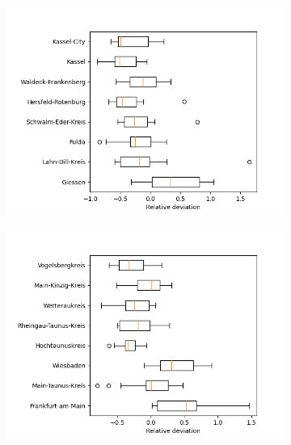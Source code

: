 \begin{figure}[h]
	\centering
	\begin{subfigure}[b]{0.4\textwidth}
		\centering
		\includegraphics[width=\textwidth]{./figures/60d/deviation_box60_1.png}	
	\end{subfigure}
	\begin{subfigure}[b]{0.4\textwidth}
		\centering
		\includegraphics[width=\textwidth]{./figures/60d/deviation_box60_2.png}	
	\end{subfigure}
	\begin{subfigure}[b]{0.4\textwidth}
		\centering

\end{subfigure}
\end{figure}
